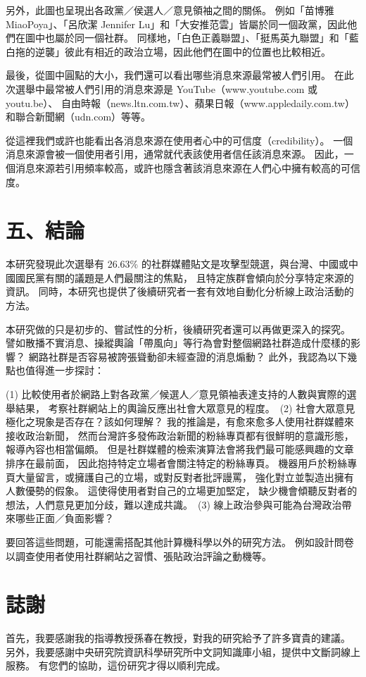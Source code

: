 \documentclass[a4paper, 10pt, conference]{ieeeconf}       %
\begin{document}
\begin{CJK}{UTF8}{bsmi}
另外，此圖也呈現出各政黨／侯選人／意見領袖之間的關係。%
例如「苗博雅 MiaoPoya」、「呂欣潔 Jennifer Lu」和「大安推范雲」皆屬於同一個政黨，因此他們在圖中也屬於同一個社群。%
同樣地，「白色正義聯盟」、「挺馬英九聯盟」和「藍白拖的逆襲」彼此有相近的政治立場，因此他們在圖中的位置也比較相近。%

最後，從圖中圓點的大小，我們還可以看出哪些消息來源最常被人們引用。%
在此次選舉中最常被人們引用的消息來源是 YouTube（www.youtube.com 或 youtu.be）、%
自由時報（news.ltn.com.tw）、蘋果日報（www.appledaily.com.tw）和聯合新聞網（udn.com）等等。%

從這裡我們或許也能看出各消息來源在使用者心中的可信度（credibility）。%
一個消息來源會被一個使用者引用，通常就代表該使用者信任該消息來源。%
因此，一個消息來源若引用頻率較高，或許也隱含著該消息來源在人們心中擁有較高的可信度。%

\section*{五、結論}

本研究發現此次選舉有 26.63\% 的社群媒體貼文是攻擊型競選，與台灣、中國或中國國民黨有關的議題是人們最關注的焦點，%
且特定族群會傾向於分享特定來源的資訊。%
同時，本研究也提供了後續研究者一套有效地自動化分析線上政治活動的方法。%

本研究做的只是初步的、嘗試性的分析，後續研究者還可以再做更深入的探究。%
譬如散播不實消息、操縱輿論「帶風向」等行為會對整個網路社群造成什麼樣的影響？%
網路社群是否容易被誇張聳動卻未經查證的消息煽動？%
此外，我認為以下幾點也值得進一步探討：%

(1) 比較使用者於網路上對各政黨／候選人／意見領袖表達支持的人數與實際的選舉結果，%
考察社群網站上的輿論反應出社會大眾意見的程度。%
\,(2) 社會大眾意見極化之現象是否存在？該如何理解？%
我的推論是，有愈來愈多人使用社群媒體來接收政治新聞，%
然而台灣許多發佈政治新聞的粉絲專頁都有很鮮明的意識形態，報導內容也相當偏頗。%
但是社群媒體的檢索演算法會將我們最可能感興趣的文章排序在最前面，%
因此抱持特定立場者會關注特定的粉絲專頁。%
機器用戶於粉絲專頁大量留言，或擁護自己的立場，或對反對者批評謾罵，%
強化對立並製造出擁有人數優勢的假象。%
這使得使用者對自己的立場更加堅定，%
缺少機會傾聽反對者的想法，人們意見更加分歧，難以達成共識。%
\,(3) 線上政治參與可能為台灣政治帶來哪些正面／負面影響？%

要回答這些問題，可能還需搭配其他計算機科學以外的研究方法。%
例如設計問卷以調查使用者使用社群網站之習慣、張貼政治評論之動機等。%


\section*{誌謝}

首先，我要感謝我的指導教授孫春在教授，對我的研究給予了許多寶貴的建議。%
另外，我要感謝中央研究院資訊科學研究所中文詞知識庫小組，提供中文斷詞線上服務。%
有您們的協助，這份研究才得以順利完成。%





\end{CJK}
\end{document}
